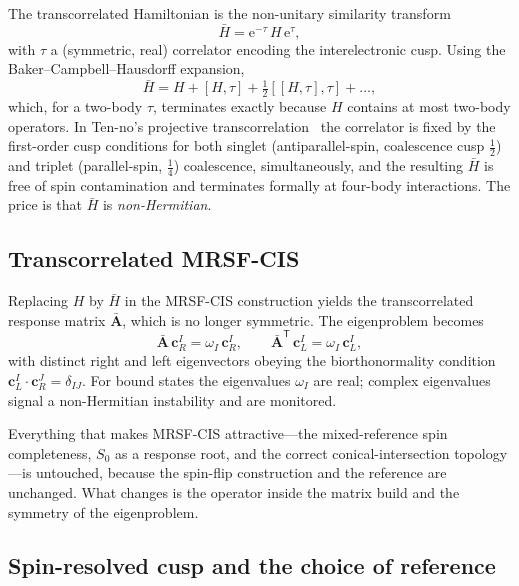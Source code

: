 \documentclass[aps,prb,reprint,superscriptaddress,floatfix]{revtex4-2}
\newcommand{\Hbar}{\bar{H}}
\newcommand{\ee}{\mathrm{e}}
\begin{document}
The transcorrelated Hamiltonian is the non-unitary similarity transform
\begin{equation}
\Hbar=\ee^{-\tau}\,H\,\ee^{\tau},
\label{eq:tc}
\end{equation}
with $\tau$ a (symmetric, real) correlator encoding the interelectronic cusp.
Using the Baker--Campbell--Hausdorff expansion,
\begin{equation}
\Hbar=H+[H,\tau]+\tfrac12[[H,\tau],\tau]+\dots,
\end{equation}
which, for a two-body $\tau$, terminates exactly because $H$ contains at most
two-body operators. In Ten-no's projective transcorrelation~\cite{tenno2023} the
correlator is fixed by the first-order cusp conditions for both singlet
(antiparallel-spin, coalescence cusp $\tfrac12$) and triplet (parallel-spin,
$\tfrac14$) coalescence, simultaneously, and the resulting $\Hbar$ is free of
spin contamination and terminates formally at four-body interactions. The price
is that $\Hbar$ is \emph{non-Hermitian}.

\subsection{Transcorrelated MRSF-CIS}

Replacing $H$ by $\Hbar$ in the MRSF-CIS construction yields the transcorrelated
response matrix $\bar{\mathbf{A}}$, which is no longer symmetric. The eigenproblem
becomes
\begin{equation}
\bar{\mathbf{A}}\,\mathbf{c}^I_{\!R}=\omega_I\,\mathbf{c}^I_{\!R},
\qquad
\bar{\mathbf{A}}^{\mathsf{T}}\,\mathbf{c}^I_{\!L}=\omega_I\,\mathbf{c}^I_{\!L},
\label{eq:tcmrsf}
\end{equation}
with distinct right and left eigenvectors obeying the biorthonormality condition
$\mathbf{c}^{I}_{\!L}\!\cdot\mathbf{c}^{J}_{\!R}=\delta_{IJ}$. For bound states
the eigenvalues $\omega_I$ are real; complex eigenvalues signal a non-Hermitian
instability and are monitored.

Everything that makes MRSF-CIS attractive---the mixed-reference spin completeness,
$S_0$ as a response root, and the correct conical-intersection topology---is
untouched, because the spin-flip construction and the reference are unchanged.
What changes is the operator inside the matrix build and the symmetry of the
eigenproblem.

\subsection{Spin-resolved cusp and the choice of reference}
\end{document}

